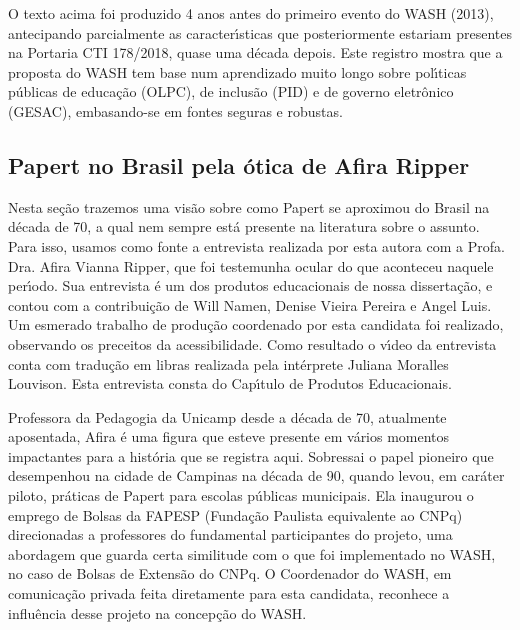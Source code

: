 \documentclass[
12pt,		%
openright,	%
twoside,  %
a4paper,			%
chapter=TITLE,		%
english,			%
french,				%
spanish,			%
brazil				%
]{USPSC-classe/USPSC}
\begin{document}
O texto acima foi produzido 4 anos antes do primeiro evento do WASH (2013), antecipando parcialmente as caracter\'{\i}sticas que posteriormente estariam presentes na Portaria CTI 178/2018, quase uma d\'ecada depois. Este registro mostra que a proposta do WASH tem base num aprendizado muito longo sobre pol\'{\i}ticas p\'ublicas de educa\c{c}\~ao (OLPC), de inclus\~ao (PID) e de governo eletr\^onico (GESAC), embasando-se em fontes seguras e robustas.










\subsection[Papert no Brasil pela \'otica de Afira Ripper]{Papert no Brasil pela \'otica de Afira Ripper}\label{Papert no Brasil pela \'otica de Afira Ripper}
Nesta se\c{c}\~ao trazemos uma vis\~ao sobre como Papert se aproximou do Brasil na d\'ecada de 70, a qual nem sempre est\'a presente na literatura sobre o assunto. Para isso, usamos como fonte a entrevista realizada por esta autora com a Profa. Dra. Afira Vianna Ripper, que foi testemunha ocular do que aconteceu naquele per\'{\i}odo. Sua entrevista \'e um dos produtos educacionais de nossa disserta\c{c}\~ao, e contou com a contribui\c{c}\~ao de Will Namen, Denise Vieira Pereira e Angel Luis. Um esmerado trabalho de produ\c{c}\~ao coordenado por esta candidata foi realizado, observando os preceitos da acessibilidade. Como resultado o v\'{\i}deo da entrevista conta com tradu\c{c}\~ao em libras realizada pela int\'erprete Juliana Moralles Louvison. Esta entrevista consta do Cap\'{\i}tulo de Produtos Educacionais.










Professora da Pedagogia da Unicamp desde a d\'ecada de 70, atualmente aposentada, Afira \'e uma figura que esteve presente em v\'arios momentos impactantes para a hist\'oria que se registra aqui. Sobressai o papel pioneiro que  desempenhou na cidade de Campinas na d\'ecada de 90, quando levou, em car\'ater piloto, pr\'aticas de Papert para escolas p\'ublicas municipais. Ela inaugurou o emprego de Bolsas da FAPESP (Funda\c{c}\~ao Paulista equivalente ao CNPq) direcionadas a professores do fundamental participantes do projeto, uma abordagem que guarda certa similitude com o que foi implementado no WASH, no caso de Bolsas de Extens\~ao do CNPq. O Coordenador do WASH, em comunica\c{c}\~ao privada feita diretamente para esta candidata, reconhece a influ\^encia desse projeto na concep\c{c}\~ao do WASH.
\end{document}
